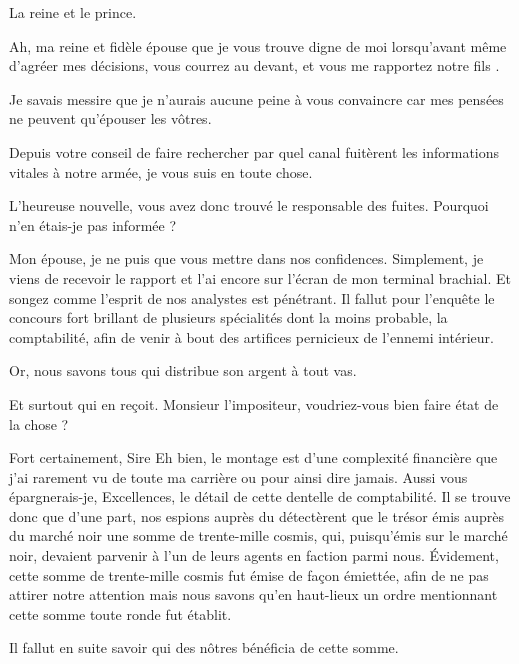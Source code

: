 
\begin{drama}
  \kingsgardsspeaks La reine et le prince.

  \roispeaks Ah, ma reine et fidèle épouse que je vous trouve digne de moi lorsqu’avant même d’agréer mes décisions, vous courrez au devant, et vous me rapportez notre fils \vladimir.

  \reinespeaks {} Je savais messire que je n’aurais aucune peine à vous convaincre car mes pensées ne peuvent qu’épouser les vôtres.

  \roispeaks Depuis votre conseil  de faire rechercher par quel canal fuitèrent les informations vitales à notre armée, je vous suis en toute chose.

  \reinespeaks L’heureuse nouvelle, vous avez donc trouvé le responsable des fuites. Pourquoi n’en étais-je pas informée ?

  \roispeaks Mon épouse, je ne puis que vous mettre dans nos confidences. Simplement, je viens de recevoir le rapport et l’ai encore sur l’écran de mon terminal brachial. Et songez comme l’esprit de nos analystes est pénétrant. Il fallut pour l’enquête le concours fort brillant de plusieurs spécialités dont la moins probable, la comptabilité, afin de venir à bout des artifices pernicieux de l’ennemi intérieur.

  \reinespeaks Or, nous savons tous qui distribue son argent à tout vas.

  \roispeaks Et surtout qui en reçoit. Monsieur l’impositeur, voudriez-vous bien faire état de la chose ?

  \impositeurspeaks Fort certainement, Sire Eh bien, le montage est d’une complexité financière que j’ai rarement vu de toute ma carrière ou pour ainsi dire jamais. Aussi vous épargnerais-je, Excellences, le détail de cette dentelle de comptabilité. Il se trouve donc que d’une part, nos espions auprès du \campoppose{} détectèrent que le trésor émis auprès du marché noir une somme de trente-mille cosmis, qui, puisqu’émis sur le marché noir, devaient parvenir à l’un de leurs agents en faction parmi nous. 
  Évidement, cette somme de trente-mille cosmis fut émise de façon émiettée, afin de ne pas attirer notre attention mais nous savons qu’en haut-lieux un ordre mentionnant cette somme toute ronde fut établit.

  \roispeaks Il fallut en suite savoir qui des nôtres bénéficia de cette somme.


\end{drama}
